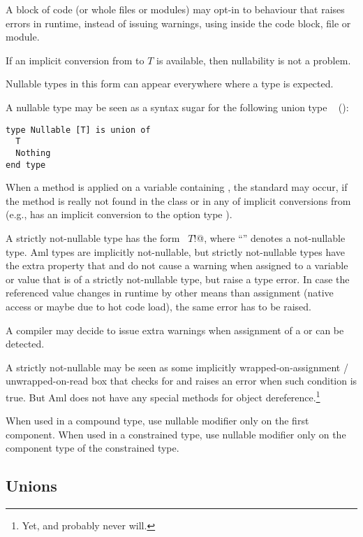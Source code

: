 A block of code (or whole files or modules) may opt-in to behaviour that raises errors in runtime, instead of issuing warnings, using  inside the code block, file or module. 

If an implicit conversion from  to $T$ is available, then nullability is not a problem. 

Nullable types in this form can appear everywhere where a type is expected. 

A nullable type may be seen as a syntax sugar for the following union type ~ ():
\begin{lstlisting}
type Nullable [T] is union of 
  T
  Nothing
end type
\end{lstlisting}

When a method is applied on a variable containing , the standard  may occur, if the method is really not found in the class  or in any of implicit conversions from  (e.g.,  has an implicit conversion to the option type ). 

A strictly not-nullable type has the form ~\lstinline@$T$!@, where ``\code{!}'' denotes a not-nullable type. Aml types are implicitly not-nullable, but strictly not-nullable types have the extra property that  and  do not cause a warning when assigned to a variable or value that is of a strictly not-nullable type, but raise a type error. In case the referenced value changes in runtime by other means than assignment (native access or maybe due to hot code load), the same error has to be raised. 

A compiler may decide to issue extra warnings when assignment of a  or  can be detected. 

A strictly not-nullable may be seen as some implicitly wrapped-on-assignment / unwrapped-on-read box that checks for  and raises an error when such condition is true. But Aml does not have any special methods for object dereference.\footnote{Yet, and probably never will.} 

When used in a compound type, use nullable modifier only on the first component. When used in a constrained type, use nullable modifier only on the component type of the constrained type. 





\subsection{Unions}
\label{sec:unions}

